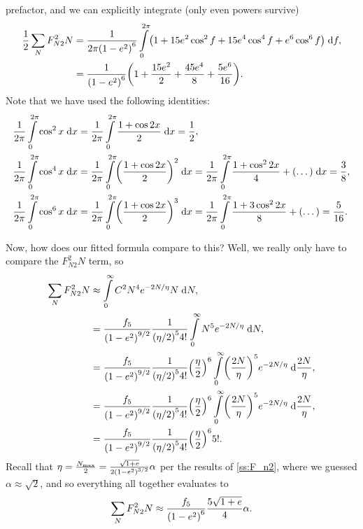 \documentclass[11pt,
        usenames, %
        dvipsnames %
    ]{article}
\DeclarePairedDelimiter\p{\lparen}{\rparen}
\begin{document}
prefactor, and we can explicitly integrate (only even powers survive)
\begin{align}
    \frac{1}{2}\sum\limits_N F_{N2}^2N
        &= \frac{1}{2\pi\p*{1 - e^2}^6}\int\limits_0^{2\pi}
            \p*{1 + 15e^2\cos^2f + 15e^4\cos^4f
                + e^6\cos^6 f}\;\mathrm{d}f,\\
        &= \frac{1}{\p*{1 - e^2}^6}\p*{1 + \frac{15e^2}{2}
            + \frac{45 e^4}{8} + \frac{5e^6}{16}}.
\end{align}
Note that we have used the following identities:
\begin{align}
    \frac{1}{2\pi}\int\limits_0^{2\pi}\cos^2x\;\mathrm{d}x
        &= \frac{1}{2\pi}
            \int\limits_0^{2\pi}\frac{1 + \cos 2x}{2}\;\mathrm{d}x
        = \frac{1}{2},\\
    \frac{1}{2\pi}\int\limits_0^{2\pi}\cos^4x\;\mathrm{d}x
        &= \frac{1}{2\pi}
            \int\limits_0^{2\pi}\p*{\frac{1 + \cos 2x}{2}}^2\;\mathrm{d}x
        = \frac{1}{2\pi}
            \int\limits_0^{2\pi}\frac{1 + \cos^2 2x}{4}
                + (\dots)\;\mathrm{d}x
        = \frac{3}{8},\\
    \frac{1}{2\pi}\int\limits_0^{2\pi}\cos^6x\;\mathrm{d}x
        &= \frac{1}{2\pi}
            \int\limits_0^{2\pi}\p*{\frac{1 + \cos 2x}{2}}^3\;\mathrm{d}x
        = \frac{1}{2\pi}
            \int\limits_0^{2\pi}\frac{1 + 3\cos^2 2x}{8}
                 + (\dots)
        = \frac{5}{16}.
\end{align}

Now, how does our fitted formula compare to this? Well, we really only have to
compare the $F_{N2}^2N$ term, so
\begin{align}
    \sum\limits_{N}F_{N2}^2N &\approx \int\limits_0^\infty
            C^2 N^4 e^{-2N/\eta}N\;\mathrm{d}N,\\
        &= \frac{f_5}{\p*{1 - e^2}^{9/2}}
                \frac{1}{\p*{\eta / 2}^5 4!}
            \int\limits_0^\infty N^5 e^{-2N/\eta}\;\mathrm{d}N,\\
        &= \frac{f_5}{\p*{1 - e^2}^{9/2}}
                \frac{1}{\p*{\eta / 2}^5 4!}
            \p*{\frac{\eta}{2}}^6
            \int\limits_0^\infty \p*{\frac{2N}{\eta}}^5
                e^{-2N/\eta}\;\mathrm{d}\frac{2N}{\eta},\\
        &= \frac{f_5}{\p*{1 - e^2}^{9/2}}
                \frac{1}{\p*{\eta / 2}^5 4!}
            \p*{\frac{\eta}{2}}^6
            \int\limits_0^\infty \p*{\frac{2N}{\eta}}^5
                e^{-2N/\eta}\;\mathrm{d}\frac{2N}{\eta},\\
        &= \frac{f_5}{\p*{1 - e^2}^{9/2}}
                \frac{1}{\p*{\eta / 2}^5 4!}
            \p*{\frac{\eta}{2}}^6 5!.
\end{align}
Recall that $\eta = \frac{N_{\max}}{2} = \frac{\sqrt{1 + e}}{2\p*{1 -
e^2}^{3/2}}\alpha$ per the results of \autoref{ss:F_n2}, where we guessed $\alpha
\approx \sqrt{2}$, and so everything all together evaluates to
\begin{equation}
    \sum\limits_{N}F_{N2}^2N \approx \frac{f_5}{\p*{1 - e^2}^{6}}
        \frac{5\sqrt{1 + e}}{4}\alpha.
\end{equation}
\end{document}
